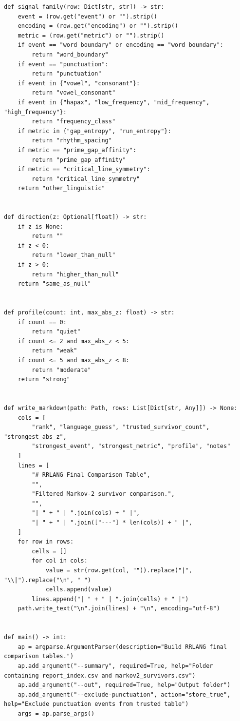\documentclass[11pt,a4paper]{article}
\begin{document}
\begin{lstlisting}
def signal_family(row: Dict[str, str]) -> str:
    event = (row.get("event") or "").strip()
    encoding = (row.get("encoding") or "").strip()
    metric = (row.get("metric") or "").strip()
    if event == "word_boundary" or encoding == "word_boundary":
        return "word_boundary"
    if event == "punctuation":
        return "punctuation"
    if event in {"vowel", "consonant"}:
        return "vowel_consonant"
    if event in {"hapax", "low_frequency", "mid_frequency", "high_frequency"}:
        return "frequency_class"
    if metric in {"gap_entropy", "run_entropy"}:
        return "rhythm_spacing"
    if metric == "prime_gap_affinity":
        return "prime_gap_affinity"
    if metric == "critical_line_symmetry":
        return "critical_line_symmetry"
    return "other_linguistic"


def direction(z: Optional[float]) -> str:
    if z is None:
        return ""
    if z < 0:
        return "lower_than_null"
    if z > 0:
        return "higher_than_null"
    return "same_as_null"


def profile(count: int, max_abs_z: float) -> str:
    if count == 0:
        return "quiet"
    if count <= 2 and max_abs_z < 5:
        return "weak"
    if count <= 5 and max_abs_z < 8:
        return "moderate"
    return "strong"


def write_markdown(path: Path, rows: List[Dict[str, Any]]) -> None:
    cols = [
        "rank", "language_guess", "trusted_survivor_count", "strongest_abs_z",
        "strongest_event", "strongest_metric", "profile", "notes"
    ]
    lines = [
        "# RRLANG Final Comparison Table",
        "",
        "Filtered Markov-2 survivor comparison.",
        "",
        "| " + " | ".join(cols) + " |",
        "| " + " | ".join(["---"] * len(cols)) + " |",
    ]
    for row in rows:
        cells = []
        for col in cols:
            value = str(row.get(col, "")).replace("|", "\\|").replace("\n", " ")
            cells.append(value)
        lines.append("| " + " | ".join(cells) + " |")
    path.write_text("\n".join(lines) + "\n", encoding="utf-8")


def main() -> int:
    ap = argparse.ArgumentParser(description="Build RRLANG final comparison tables.")
    ap.add_argument("--summary", required=True, help="Folder containing report_index.csv and markov2_survivors.csv")
    ap.add_argument("--out", required=True, help="Output folder")
    ap.add_argument("--exclude-punctuation", action="store_true", help="Exclude punctuation events from trusted table")
    args = ap.parse_args()


\end{lstlisting}
\end{document}
